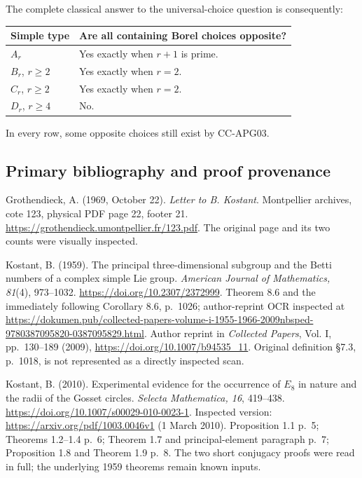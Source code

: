 \documentclass[11pt,a4paper]{article}
\theoremstyle{definition}\newtheorem{definition}[theorem]{Definition}
\theoremstyle{remark}\newtheorem{remark}[theorem]{Remark}
\begin{document}
The complete classical answer to the universal-choice question is
consequently:

\begin{longtable}[]{@{}ll@{}}
\toprule\noalign{}
Simple type & Are all containing Borel choices opposite? \\
\midrule\noalign{}
\endhead
\bottomrule\noalign{}
\endlastfoot
\(A_r\) & Yes exactly when \(r+1\) is prime. \\
\(B_r\), \(r\geq2\) & Yes exactly when \(r=2\). \\
\(C_r\), \(r\geq2\) & Yes exactly when \(r=2\). \\
\(D_r\), \(r\geq4\) & No. \\
\end{longtable}

In every row, some opposite choices still exist by CC-APG03.

\subsection{Primary bibliography and proof
provenance}\label{primary-bibliography-and-proof-provenance}

Grothendieck, A. (1969, October 22). \emph{Letter to B. Kostant}.
Montpellier archives, cote 123, physical PDF page 22, footer 21.
\url{https://grothendieck.umontpellier.fr/123.pdf}. The original page and its
two counts were visually inspected.

Kostant, B. (1959). The principal three-dimensional subgroup and the
Betti numbers of a complex simple Lie group. \emph{American Journal of
Mathematics, 81}(4), 973--1032. \url{https://doi.org/10.2307/2372999}. Theorem
8.6 and the immediately following Corollary 8.6, p.~1026; author-reprint
OCR inspected at
\url{https://dokumen.pub/collected-papers-volume-i-1955-1966-2009nbsped-9780387095820-0387095829.html}.
Author reprint in \emph{Collected Papers}, Vol. I, pp.~130--189 (2009),
\url{https://doi.org/10.1007/b94535\_11}. Original definition §7.3, p.~1018,
is not represented as a directly inspected scan.

Kostant, B. (2010). Experimental evidence for the occurrence of \(E_8\)
in nature and the radii of the Gosset circles. \emph{Selecta
Mathematica, 16}, 419--438. \url{https://doi.org/10.1007/s00029-010-0023-1}.
Inspected version: \url{https://arxiv.org/pdf/1003.0046v1} (1 March 2010).
Proposition 1.1 p.~5; Theorems 1.2--1.4 p.~6; Theorem 1.7 and
principal-element paragraph p.~7; Proposition 1.8 and Theorem 1.9 p.~8.
The two short conjugacy proofs were read in full; the underlying 1959
theorems remain known inputs.
\end{document}

